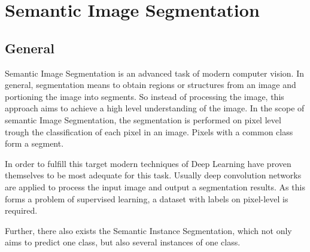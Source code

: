 
\section{Semantic Image Segmentation}\label{ord:ch2:sec2}

\subsection{General}\label{ord:ch2:sec2:subsec1}

Semantic Image Segmentation is an advanced task of modern computer vision.
In general, segmentation means to obtain regions or structures from an image and portioning the image into segments.
So instead of processing the image, this approach aims to achieve a high level understanding of the image.
In the scope of semantic Image Segmentation, the segmentation is performed on pixel level trough the classification of each pixel in an image. 
Pixels with a common class form a segment.

In order to fulfill this target modern techniques of Deep Learning have proven themselves to be most adequate for this task.
Usually deep convolution networks are applied to process the input image and output a segmentation results.
As this forms a problem of supervised learning, a dataset with labels on pixel-level is required.


Further, there also exists the Semantic Instance Segmentation, which not only aims to predict one class, but also several instances of one class.











